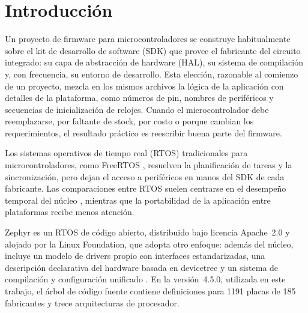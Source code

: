 \renewcommand{\lstlistingname}{Listado}
\newcommand{\ok}{\ding{51}}
\newcommand{\nok}{--}

\section{Introducción}

Un proyecto de firmware para microcontroladores se construye habitualmente sobre el kit de desarrollo de software (SDK) que provee el fabricante del circuito integrado: su capa de abstracción de hardware (HAL), su sistema de compilación y, con frecuencia, su entorno de desarrollo. Esta elección, razonable al comienzo de un proyecto, mezcla en los mismos archivos la lógica de la aplicación con detalles de la plataforma, como números de pin, nombres de periféricos y secuencias de inicialización de relojes. Cuando el microcontrolador debe reemplazarse, por faltante de stock, por costo o porque cambian los requerimientos, el resultado práctico es reescribir buena parte del firmware.

Los sistemas operativos de tiempo real (RTOS) tradicionales para microcontroladores, como FreeRTOS \cite{barry_freertos}, resuelven la planificación de tareas y la sincronización, pero dejan el acceso a periféricos en manos del SDK de cada fabricante. Las comparaciones entre RTOS suelen centrarse en el desempeño temporal del núcleo \cite{ungurean2020}, mientras que la portabilidad de la aplicación entre plataformas recibe menos atención.

Zephyr es un RTOS de código abierto, distribuido bajo licencia Apache~2.0 y alojado por la Linux Foundation, que adopta otro enfoque: además del núcleo, incluye un modelo de drivers propio con interfaces estandarizadas, una descripción declarativa del hardware basada en devicetree y un sistema de compilación y configuración unificado \cite{zephyr_docs}. En la versión~4.5.0, utilizada en este trabajo, el árbol de código fuente contiene definiciones para 1191 placas de 185 fabricantes y trece arquitecturas de procesador.

